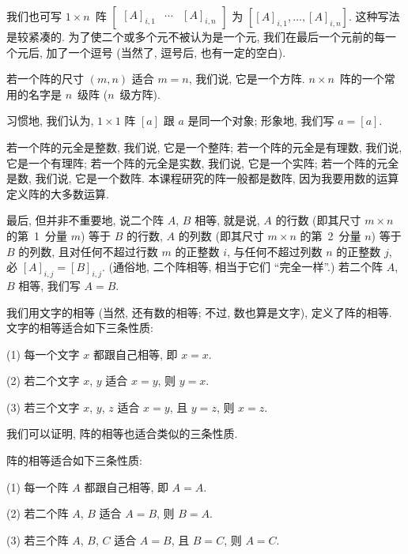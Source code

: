 \begin{definition}[阵]
    我们也可写 \(1 \times n\)~阵
    \(
    \begin{bmatrix}
        [A]_{i,1} & \cdots & [A]_{i,n}
    \end{bmatrix}
    \)
    为
    \(
    [[A]_{i,1}, \dots, [A]_{i,n}]
    \).
    这种写法是较紧凑的.
    为了使二个或多个元不被认为是一个元,
    我们在最后一个元前的每一个元后,
    加了一个逗号
    (当然了, 逗号后, 也有一定的空白).

    若一个阵的尺寸 \((m, n)\) 适合 \(m = n\),
    我们说, 它是一个方阵.
    \(n \times n\)~阵的一个常用的名字是 \(n\)~级阵
    (\(n\)~级方阵).

    习惯地,
    我们认为, \(1 \times 1\) 阵 \([a]\)
    跟 \(a\) 是同一个对象;
    形象地, 我们写 \(a = [a]\).

    若一个阵的元全是整数, 我们说, 它是一个整阵;
    若一个阵的元全是有理数, 我们说, 它是一个有理阵;
    若一个阵的元全是实数, 我们说, 它是一个实阵;
    若一个阵的元全是数, 我们说, 它是一个数阵.
    本课程研究的阵一般都是数阵,
    因为我要用数的运算定义阵的大多数运算.

    最后, 但并非不重要地, 说二个阵 \(A\), \(B\) 相等,
    就是说,
    \(A\) 的行数 (即其尺寸 \(m \times n\) 的第~1~分量 \(m\))
    等于 \(B\) 的行数,
    \(A\) 的列数 (即其尺寸 \(m \times n\) 的第~2~分量 \(n\))
    等于 \(B\) 的列数,
    且对任何不超过行数 \(m\) 的正整数 \(i\),
    与任何不超过列数 \(n\) 的正整数 \(j\),
    必 \([A]_{i,j} = [B]_{i,j}\).
    (通俗地, 二个阵相等, 相当于它们 ``完全一样''.)
    若二个阵 \(A\), \(B\) 相等,
    我们写 \(A = B\).
\end{definition}

我们用文字的相等
(当然, 还有数的相等; 不过, 数也算是文字),
定义了阵的相等.
文字的相等适合如下三条性质:

(1)
每一个文字 \(x\) 都跟自己相等, 即 \(x = x\).

(2)
若二个文字 \(x\), \(y\) 适合 \(x = y\), 则 \(y = x\).

(3)
若三个文字 \(x\), \(y\), \(z\) 适合 \(x = y\), 且 \(y = z\),
则 \(x = z\).

我们可以证明, 阵的相等也适合类似的三条性质.

\begin{theorem}
    阵的相等适合如下三条性质:

    (1)
    每一个阵 \(A\) 都跟自己相等, 即 \(A = A\).

    (2)
    若二个阵 \(A\), \(B\) 适合 \(A = B\), 则 \(B = A\).

    (3)
    若三个阵 \(A\), \(B\), \(C\) 适合 \(A = B\), 且 \(B = C\),
    则 \(A = C\).
\end{theorem}

